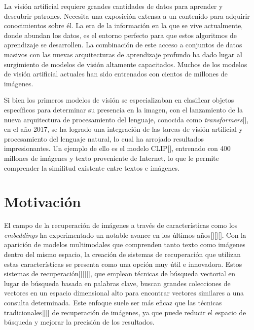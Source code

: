 La visi\'on artificial requiere grandes cantidades de datos para aprender y descubrir patrones. Necesita una exposici\'on extensa a un contenido para adquirir conocimientos sobre \'el. La era de la informaci\'on en la que se vive actualmente, donde abundan los datos, es el entorno perfecto para que estos algoritmos de aprendizaje se desarrollen. La combinaci\'on de este acceso a conjuntos de datos masivos con las nuevas arquitecturas de aprendizaje profundo ha dado lugar al surgimiento de modelos de visi\'on altamente capacitados. Muchos de los modelos de visi\'on artificial actuales han sido entrenados con cientos de millones de im\'agenes.

Si bien los primeros modelos de visi\'on se especializaban en clasificar objetos espec\'ificos para determinar su presencia en la imagen, con el lanzamiento de la nueva arquitectura de procesamiento del lenguaje, conocida como \textit{transformers}[\cite{transformers}], en el a\~no 2017, se ha logrado una integraci\'on de las tareas de visi\'on artificial y procesamiento del lenguaje natural, lo cual ha arrojado resultados impresionantes. Un ejemplo de ello es el modelo CLIP[\cite{clip-paper}], entrenado con 400 millones de im\'agenes y texto proveniente de Internet, lo que le permite comprender la similitud existente entre textos e im\'agenes.

\section*{Motivaci\'on}
El campo de la recuperación de imágenes a través de características como los \textit{embeddings} ha experimentado un notable avance en los últimos años[\cite{embedding1}][\cite{embedding2}][\cite{Baldrati2022}]. Con la aparición de modelos multimodales que comprenden tanto texto como imágenes dentro del mismo espacio, la creación de sistemas de recuperación que utilizan estas características se presenta como una opción muy útil e innovadora. Estos sistemas de recuperación[\cite{keita2023clip}][\cite{Baldrati2022}][\cite{embedding2}], que emplean técnicas de búsqueda vectorial en lugar de búsqueda basada en palabras clave, buscan grandes colecciones de vectores en un espacio dimensional alto para encontrar vectores similares a una consulta determinada. Este enfoque suele ser más eficaz que las técnicas tradicionales[\cite{Perez2023-Etiquetado}][\cite{RoblesSanchez2004}] de recuperación de imágenes, ya que puede reducir el espacio de búsqueda y mejorar la precisión de los resultados.

